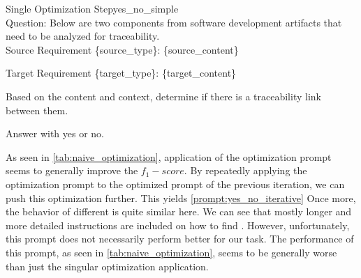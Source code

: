 \begin{prompt}{\KISS Single Optimization Step}{yes_no_simple}\\
    Question: Below are two components from software development artifacts that need to be analyzed for traceability.\\

            Source Requirement \{source\_type\}: \tripplequote\{source\_content\}\tripplequote

            Target Requirement \{target\_type\}: \tripplequote\{target\_content\}\tripplequote
            
            Based on the content and context, determine if there is a traceability link between them.

            Answer with \textquotesingle{}yes\textquotesingle{} or \textquotesingle{}no\textquotesingle{}.
    
\end{prompt}

As seen in \autoref{tab:naive_optimization}, application of the optimization prompt seems to generally improve the $f_1-score$. 
By repeatedly applying the optimization prompt to the optimized prompt of the previous iteration, we can push this optimization further.
This yields \autoref{prompt:yes_no_iterative}
Once more, the behavior of different \LLMs is quite similar here.
We can see that mostly longer and more detailed instructions are included on how to find \TLs. 
However, unfortunately, this prompt does not necessarily perform better for our task. 
The performance of this prompt, as seen in \autoref{tab:naive_optimization}, seems to be generally worse than just the singular optimization application.

